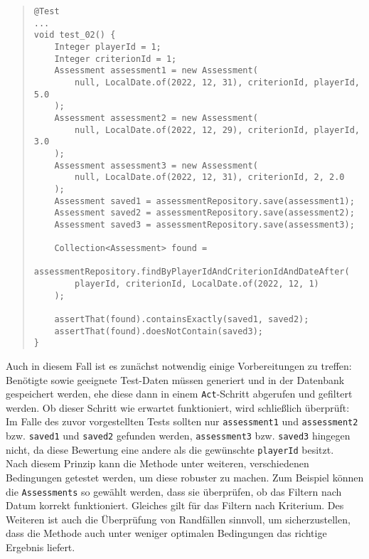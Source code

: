 \begin{quote}
\begin{verbatim}
@Test
...
void test_02() {
    Integer playerId = 1;
    Integer criterionId = 1;
    Assessment assessment1 = new Assessment(
        null, LocalDate.of(2022, 12, 31), criterionId, playerId, 5.0
    );
    Assessment assessment2 = new Assessment(
        null, LocalDate.of(2022, 12, 29), criterionId, playerId, 3.0
    );
    Assessment assessment3 = new Assessment(
        null, LocalDate.of(2022, 12, 31), criterionId, 2, 2.0
    );
    Assessment saved1 = assessmentRepository.save(assessment1);
    Assessment saved2 = assessmentRepository.save(assessment2);
    Assessment saved3 = assessmentRepository.save(assessment3);

    Collection<Assessment> found = 
        assessmentRepository.findByPlayerIdAndCriterionIdAndDateAfter(
        playerId, criterionId, LocalDate.of(2022, 12, 1)
    );

    assertThat(found).containsExactly(saved1, saved2);
    assertThat(found).doesNotContain(saved3);
}
\end{verbatim}
\end{quote}

Auch in diesem Fall ist es zunächst notwendig einige Vorbereitungen zu treffen: 
Benötigte sowie geeignete Test-Daten müssen generiert und in der Datenbank gespeichert 
werden, ehe diese dann in einem \texttt{Act}-Schritt abgerufen und gefiltert 
werden. Ob dieser Schritt wie erwartet funktioniert, wird schließlich überprüft: Im 
Falle des zuvor vorgestellten Tests sollten nur \texttt{assessment1} und 
\texttt{assessment2} bzw. \texttt{saved1} und \texttt{saved2} gefunden werden, 
\texttt{assessment3} bzw. \texttt{saved3} hingegen nicht, da diese Bewertung eine 
andere als die gewünschte \texttt{playerId} besitzt. \\ 
Nach diesem Prinzip kann die Methode unter weiteren, verschiedenen Bedingungen 
getestet werden, um diese robuster zu machen. Zum Beispiel können die 
\texttt{Assessments} so gewählt werden, dass sie überprüfen, ob das Filtern nach 
Datum korrekt funktioniert. Gleiches gilt für das Filtern nach Kriterium. Des Weiteren 
ist auch die Überprüfung von Randfällen sinnvoll, um sicherzustellen, dass die 
Methode auch unter weniger optimalen Bedingungen das richtige Ergebnis liefert. 

